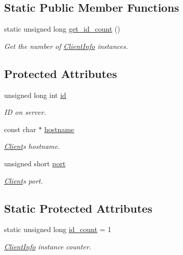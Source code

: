 \subsection*{Static Public Member Functions}
\begin{DoxyCompactItemize}
\item 
static unsigned long \hyperlink{class_zamasu_1_1_client_info_a5106c121a1051a35259bea2de5fd19a2}{get\+\_\+id\+\_\+count} ()
\begin{DoxyCompactList}\small\item\em Get the number of \hyperlink{class_zamasu_1_1_client_info}{Client\+Info} instances. \end{DoxyCompactList}\end{DoxyCompactItemize}
\subsection*{Protected Attributes}
\begin{DoxyCompactItemize}
\item 
unsigned long int \hyperlink{class_zamasu_1_1_client_info_a70071ec83c0aeca5dbfdfb539ac0c989}{id}
\begin{DoxyCompactList}\small\item\em ID on server. \end{DoxyCompactList}\item 
const char $\ast$ \hyperlink{class_zamasu_1_1_client_info_a97baa615785948d4f8bc1f31af9ed056}{hostname}
\begin{DoxyCompactList}\small\item\em \hyperlink{class_zamasu_1_1_client}{Client}\textquotesingle{}s hostname. \end{DoxyCompactList}\item 
unsigned short \hyperlink{class_zamasu_1_1_client_info_a0072d23fd63fbd8e831556940bd69ce1}{port}
\begin{DoxyCompactList}\small\item\em \hyperlink{class_zamasu_1_1_client}{Client}\textquotesingle{}s port. \end{DoxyCompactList}\end{DoxyCompactItemize}
\subsection*{Static Protected Attributes}
\begin{DoxyCompactItemize}
\item 
static unsigned long \hyperlink{class_zamasu_1_1_client_info_a61083b34d39143869cda9bb1ca7aa323}{id\+\_\+count} = 1
\begin{DoxyCompactList}\small\item\em \hyperlink{class_zamasu_1_1_client_info}{Client\+Info} instance counter. \end{DoxyCompactList}\end{DoxyCompactItemize}


